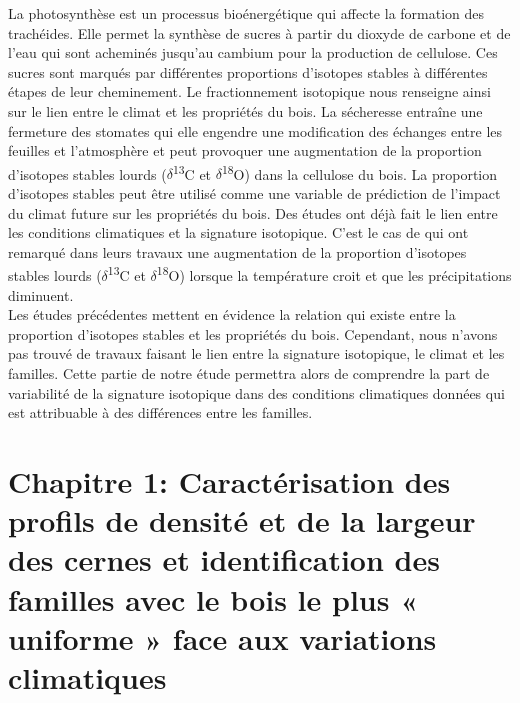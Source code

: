 \documentclass{report}
\newcommand{\Ctreize}{$\delta$\textsuperscript{13}C\xspace}
\newcommand{\Odixhuit}{$\delta$\textsuperscript{18}O\xspace}
\begin{document}
\begin{itemize}
	
	La photosynthèse est un processus bioénergétique qui affecte la formation des trachéides. %
	Elle permet la synthèse de sucres à partir du dioxyde de carbone et de l'eau %
	qui sont acheminés jusqu'au cambium pour la production de cellulose. Ces sucres sont marqués par différentes proportions d'isotopes stables à différentes étapes de leur cheminement. Le fractionnement isotopique nous renseigne ainsi sur le lien entre le climat et les propriétés du bois. La sécheresse entraîne une fermeture des stomates \citep{Farquhar1989, Farquhar1993, Nicolas2017} qui elle engendre une modification des échanges entre les feuilles et l'atmosphère et peut provoquer une augmentation de la proportion d'isotopes stables lourds (\Ctreize et \Odixhuit) \citep{McCarroll2004,Skomarkova2006,Vaganov2009,Cernusak2015} dans la cellulose du bois. La proportion d'isotopes stables peut 
	être utilisé comme une variable de prédiction de l'impact du climat future sur les propriétés du bois. Des études ont déjà fait le lien entre les conditions climatiques et la signature isotopique. C'est le cas de  \cite{Seftigen2011} qui ont remarqué dans leurs travaux une augmentation de la proportion d'isotopes stables lourds (\Ctreize et \Odixhuit) lorsque la température croit et que les précipitations diminuent.\\
	
	Les études précédentes mettent en évidence la relation qui existe entre la proportion d'isotopes stables et les propriétés du bois. Cependant, nous n'avons pas trouvé de travaux faisant le lien entre la signature isotopique, le climat et les familles. Cette partie de notre étude permettra alors de comprendre la part de variabilité de la signature isotopique dans des conditions climatiques données qui est attribuable à des différences entre les familles. 
	
	
\end{itemize} 


\chapter{Chapitre 1: Caractérisation des profils de densité et de la largeur des cernes et identification des familles avec le bois le plus « uniforme » face aux variations climatiques}
\end{document}
